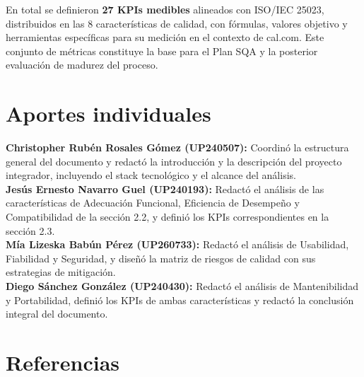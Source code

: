 \documentclass[12pt, a4paper]{article}
\begin{document}
En total se definieron \textbf{27 KPIs medibles} alineados con ISO/IEC 25023,
distribuidos en las 8 características de calidad, con fórmulas, valores objetivo y
herramientas específicas para su medición en el contexto de cal.com. Este conjunto de
métricas constituye la base para el Plan SQA y la posterior evaluación de madurez del
proceso.

\section{Aportes individuales}

\textbf{Christopher Rubén Rosales Gómez (UP240507):} Coordinó la estructura general del documento y redactó la introducción y la descripción del proyecto integrador, incluyendo el stack tecnológico y el alcance del análisis.\\[0.3cm]

\textbf{Jesús Ernesto Navarro Guel (UP240193):} Redactó el análisis de las características de Adecuación Funcional, Eficiencia de Desempeño y Compatibilidad de la sección 2.2, y definió los KPIs correspondientes en la sección 2.3.\\[0.3cm]

\textbf{Mía Lizeska Babún Pérez (UP260733):} Redactó el análisis de Usabilidad, Fiabilidad y Seguridad, y diseñó la matriz de riesgos de calidad con sus estrategias de mitigación.\\[0.3cm]

\textbf{Diego Sánchez González (UP240430):} Redactó el análisis de Mantenibilidad y Portabilidad, definió los KPIs de ambas características y redactó la conclusión integral del documento.

\newpage
\section{Referencias}
\printbibliography
\end{document}
